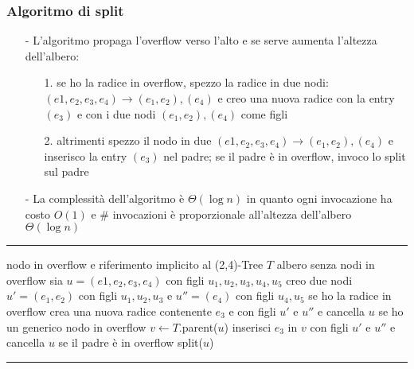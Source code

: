 \documentclass[a4paper]{article}
\makeatletter
\newenvironment{algo}[4]{
	\noindent\rule{\textwidth}{0.4pt}
	\begin{algorithmic}[1]
		\addtocounter{ALG@line}{-1}
		\Procedure{#1}{#2}
		\Require #3
		\Ensure #4
		\Statex }{
		\EndProcedure
	\end{algorithmic}
	\rule{\textwidth}{0.4pt}}
\makeatother
\begin{document}
\subsubsection*{Algoritmo di split}
\begin{itemize}[topsep=3pt, itemsep=0pt]
	\item[-] L'algoritmo propaga l'overflow verso l'alto e se serve aumenta l'altezza dell'albero:
	\begin{itemize}[topsep=0pt, itemsep=0pt]
		\item[1.] se ho la radice in overflow, spezzo la radice in due nodi: \((e1, e_2, e_3, e_4) \rightarrow (e_1,e_2), (e_4)\)
		e creo una nuova radice con la entry  \((e_3)\) e con i due nodi \((e_1,e_2), (e_4)\) come figli
		\item[2.] altrimenti spezzo il nodo in due \((e1, e_2, e_3, e_4) \rightarrow (e_1,e_2), (e_4)\) e inserisco la entry
		 \((e_3)\) nel padre; se il padre è in overflow, invoco lo split sul padre
	\end{itemize}
	\item[-] La complessità dell'algoritmo è \(\Theta(\log n)\) in quanto ogni invocazione ha costo \(O(1)\) e \# invocazioni
	è proporzionale all'altezza dell'albero \(\Theta(\log n)\)
\end{itemize}
\begin{algo}{split}{$u$}{nodo in overflow e riferimento implicito al (2,4)-Tree $T$}{albero senza nodi in overflow}
	\State sia $u = (e1, e_2, e_3, e_4)$ con figli $u_1, u_2, u_3, u_4, u_5$
	\State creo due nodi $u' = (e_1, e_2)$ con figli $u_1, u_2, u_3$ e $u'' = (e_4)$ con figli $u_4, u_5$
	 \Comment se ho la radice in overflow
		\State crea una nuova radice contenente $e_3$ e con figli $u'$ e $u''$ e cancella $u$
	\Else \Comment se ho un generico nodo in overflow
		\State $v \gets T$.parent($u$)
		\State inserisci $e_3$ in $v$ con figli $u'$ e $u''$ e cancella $u$
		 \Comment se il padre è in overflow
			\State split($u$)
		\EndIf
	\EndIf
\end{algo}
\end{document}
